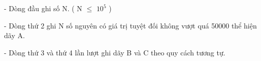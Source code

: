 - Dòng đầu ghi số N. ( N  $\le$  $10^{5}$   )  

   - Dòng thứ 2 ghi N số nguyên có giá trị tuyệt đối không vượt quá 50000 thể hiện dãy A.  

   - Dòng thứ 3 và thứ 4 lần lượt ghi dãy B và C theo quy cách tương tự.